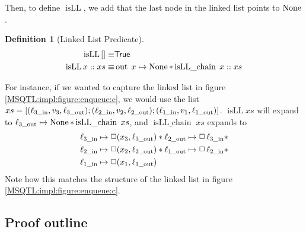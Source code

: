 \documentclass[twoside,11pt,openright]{report}
\newtheorem{definition}{Definition}[section]
\newcommand{\isLLchain}[1]{\operatorname{isLL\_chain} \; #1}
\newcommand{\isLL}{\operatorname{isLL}}
\newcommand{\locin}[1]{\loc_{#1\_\text{in}}}
\newcommand{\locout}[1]{\loc_{#1\_\text{out}}}
\newcommand{\nOut}[1]{\operatorname{out} \; #1}
\begin{document}
Then, to define $\isLL$, we add that the last node in the linked list points to $\operatorname{None}$.
\begin{definition}[Linked List Predicate]
  \begin{align*}
    \isLL{[]} \equiv& \TRUE\\
    \isLL{x :: xs} \equiv& \nOut{x} \mapsto \None \ast \isLLchain{x :: xs}
  \end{align*}
\end{definition}

For instance, if we wanted to capture the linked list in figure \ref{MSQTL:impl:figure:enqueue:c}, we would use the list $xs = [(\locin{3}, v_3, \locout{3}); (\locin{2}, v_2, \locout{2});  (\locin{1}, v_1, \locout{1})]$. $\isLL{xs}$ will expand to $\locout{3} \mapsto \None \ast \isLLchain{xs}$, and $\isLLchain{xs}$ expands to
\begin{align*}
  &\locin{3} \mapsto\persistently (x_3, \locout{3}) \ast \locout{2}	\mapsto\persistently \locin{3}\ast\\
  &\locin{2} \mapsto\persistently (x_2, \locout{2}) \ast \locout{1}\mapsto\persistently \locin{2} \ast\\
  &\locin{1} \mapsto\persistently (x_1, \locout{1})
\end{align*}
Note how this matches the structure of the linked list in figure \ref{MSQTL:impl:figure:enqueue:c}.

\subsection{Proof outline}
\end{document}
